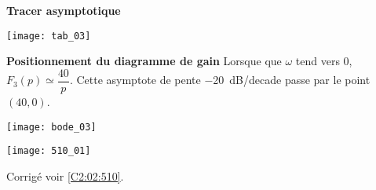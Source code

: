 \ifprof

\textbf{Tracer asymptotique}

\begin{center}
\texttt{[image: tab\_03]}
\end{center}


\textbf{Positionnement du diagramme de gain}
Lorsque que $\omega$ tend vers 0, $F_3(p)\simeq \dfrac{40}{p}$. Cette asymptote de pente \SI{-20}{dB/decade} passe par le point $(40,0)$. 

\begin{center}
\texttt{[image: bode\_03]}
\end{center}

\else 
\begin{center}
\texttt{[image: 510\_01]}
\end{center}
\fi







 

\ifprof
\else
\begin{flushright}
\footnotesize{Corrigé  voir \ref{C2:02:510}.}
\end{flushright}%
\fi